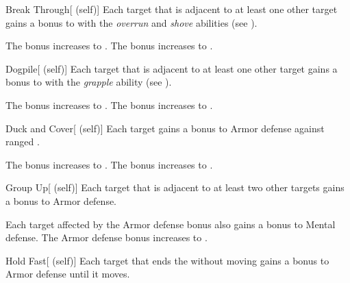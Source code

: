        {
            \begin{attuneability}{Break Through}[ (self)]
                Each target that is adjacent to at least one other target
                    gains a  bonus to  with the \textit{overrun} and \textit{shove} abilities (see ).

                \rankline
                 The bonus increases to .
                 The bonus increases to .
            \end{attuneability}

            \begin{attuneability}{Dogpile}[ (self)]
                Each target that is adjacent to at least one other target
                    gains a  bonus to  with the \textit{grapple} ability (see ).

                \rankline
                 The bonus increases to .
                 The bonus increases to .
            \end{attuneability}

            \begin{attuneability}{Duck and Cover}[ (self)]
                Each target gains a  bonus to Armor defense against ranged .

                \rankline
                 The bonus increases to .
                 The bonus increases to .
            \end{attuneability}

            \begin{attuneability}{Group Up}[ (self)]
                Each target that is adjacent to at least two other targets gains a  bonus to Armor defense.

                \rankline
                 Each target affected by the Armor defense bonus also gains a  bonus to Mental defense.
                 The Armor defense bonus increases to .
            \end{attuneability}

            \begin{attuneability}{Hold Fast}[ (self)]
                Each target that ends the  without moving gains a  bonus to Armor defense until it moves.


\end{attuneability}}
